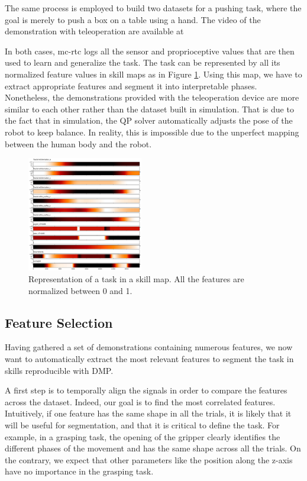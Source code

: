 \documentclass[conference]{IEEEtran}
\begin{document}
 The same process is employed to build two datasets for a pushing task, where the goal is merely to push a box on a table using a hand. The video of the demonstration with teleoperation are available at 

 In both cases, mc-rtc logs all the sensor and proprioceptive values that are then used to learn and generalize the task. The task can be represented by all its normalized feature values in skill maps as in Figure \ref{fig:skillmap}. Using this map, we have to extract appropriate features and segment it into interpretable phases. Nonetheless, the demonstrations provided with the teleoperation device are more similar to each other rather than the dataset built in simulation. That is due to the fact that in simulation, the QP solver automatically adjusts the pose of the robot to keep balance. In reality, this is impossible due to the unperfect mapping between the human body and the robot.

 \begin{figure}[ht]
  \centering
  \includegraphics[width=0.45\textwidth]{img/skillMap.png}
  \caption{Representation of a task in a skill map. All the features are normalized between 0 and 1.}
  \label{fig:skillmap}
\end{figure}


\subsection{Feature Selection} \label{feature_selection}

Having gathered a set of demonstrations containing numerous features, we now want to automatically extract the most relevant features to segment the task in skills reproducible with DMP.

A first step is to temporally align the signals in order to compare the features across the dataset. Indeed, our goal is to find the most correlated features. Intuitively, if one feature has the same shape in all the trials, it is likely that it will be useful for segmentation, and that it is critical to define the task. For example, in a grasping task, the opening of the gripper clearly identifies the different phases of the movement and has the same shape across all the trials. On the contrary, we expect that other parameters like the position along the z-axis have no importance in the grasping task.
\end{document}
